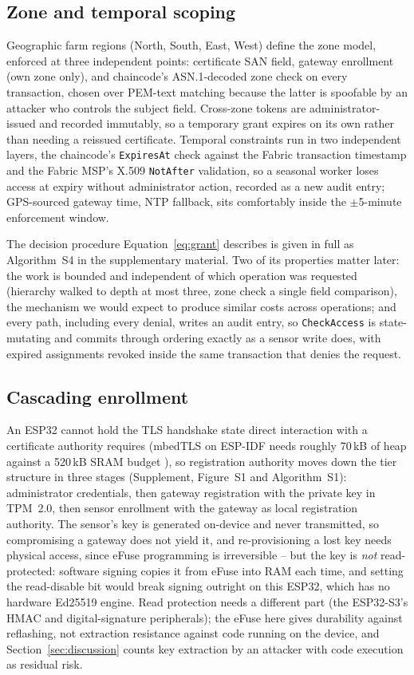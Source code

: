 \documentclass[a4paper,fleqn]{cas-sc}
\begin{document}
\subsection{Zone and temporal scoping}
\label{subsec:zones}

Geographic farm regions (North, South, East, West) define the zone model,
enforced at three independent points: certificate SAN field, gateway
enrollment (own zone only), and chaincode's ASN.1-decoded zone check on
every transaction, chosen over PEM-text matching because the latter is
spoofable by an attacker who controls the subject field. Cross-zone
tokens are administrator-issued and recorded immutably, so a temporary
grant expires on its own rather than needing a reissued certificate.
Temporal constraints run in two independent layers, the chaincode's
\texttt{ExpiresAt} check against the Fabric transaction timestamp and the
Fabric MSP's X.509 \texttt{NotAfter} validation, so a seasonal worker
loses access at expiry without administrator action, recorded as a new
audit entry; GPS-sourced gateway time, NTP fallback, sits comfortably
inside the $\pm$5-minute enforcement window.

The decision procedure Equation~\eqref{eq:grant} describes is given in
full as Algorithm~S4 in the supplementary material. Two of its properties
matter later: the work is bounded and independent of which operation was
requested (hierarchy walked to depth at most three, zone check a single
field comparison), the mechanism we would expect to produce similar costs
across operations; and every path, including every denial, writes an
audit entry, so \texttt{CheckAccess} is state-mutating and commits through
ordering exactly as a sensor write does, with expired assignments revoked
inside the same transaction that denies the request.

\subsection{Cascading enrollment}
\label{subsec:enrollment}

An ESP32 cannot hold the TLS handshake state direct interaction with a
certificate authority requires (mbedTLS on ESP-IDF needs roughly 70\,kB of
heap against a 520\,kB SRAM budget \cite{raza2013lithe}), so registration
authority moves down the tier structure in three stages (Supplement,
Figure~S1 and Algorithm~S1): administrator credentials, then gateway
registration with the private key in TPM~2.0, then sensor enrollment with
the gateway as local registration authority. The sensor's key is generated
on-device and never transmitted, so compromising a gateway does not yield
it, and re-provisioning a lost key needs physical access, since eFuse
programming is irreversible -- but the key is \emph{not} read-protected:
software signing copies it from eFuse into RAM each time, and setting the
read-disable bit would break signing outright on this ESP32, which has no
hardware Ed25519 engine. Read protection needs a different part (the
ESP32-S3's HMAC and digital-signature peripherals); the eFuse here gives
durability against reflashing, not extraction resistance against code
running on the device, and Section~\ref{sec:discussion} counts key
extraction by an attacker with code execution as residual risk.
\end{document}
